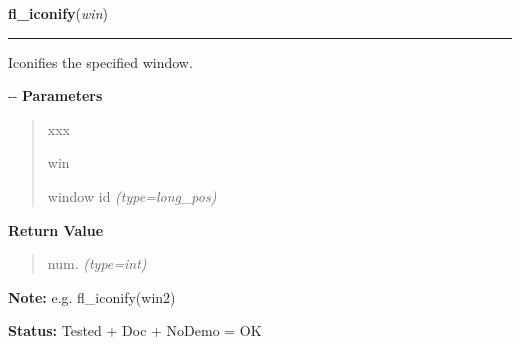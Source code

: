\hspace{.8\funcindent}\begin{boxedminipage}{\funcwidth}

    \raggedright \textbf{fl\_iconify}(\textit{win})

    \vspace{-1.5ex}

    \rule{\textwidth}{0.5\fboxrule}
\setlength{\parskip}{2ex}

Iconifies the specified window.

-{}-
\setlength{\parskip}{1ex}
      \textbf{Parameters}
      \vspace{-1ex}

      \begin{quote}
        \begin{Ventry}{xxx}

          \item[win]


window id
            {\it (type=long\_pos)}

        \end{Ventry}

      \end{quote}

      \textbf{Return Value}
    \vspace{-1ex}

      \begin{quote}

num.
      {\it (type=int)}

      \end{quote}

\textbf{Note:} 
e.g. fl\_iconify(win2)


\textbf{Status:} 
Tested + Doc + NoDemo = OK


    \end{boxedminipage}

    \label{xformslib:flxbasic:fl_winresize}

    \vspace{0.5ex}

